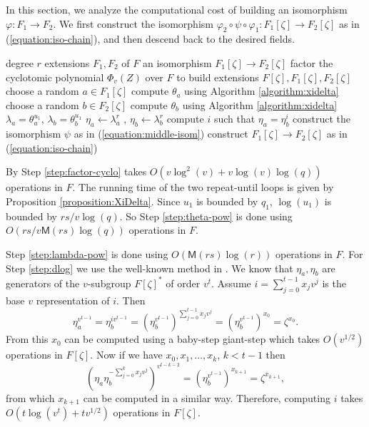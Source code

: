 \documentclass[12pt]{article}
\theoremstyle{plain}
\theoremstyle{definition}
\def\MM{\ensuremath{\mathsf{M}}}
\newcounter{algorithm}
\begin{document}
In this section, we analyze the computational cost of building an isomorphism $\varphi: F_1 
\rightarrow F_2$. We first construct the isomorphism $\varphi_2 \circ \psi \circ \varphi_1 : 
F_1[\zeta] \rightarrow F_2[\zeta]$ as in (\ref{equation:iso-chain}), and then descend back to the 
desired fields.
\begin{algorithm}
	\label{algorithm:ext-iso}
	\begin{algorithmic}[1]
		\REQUIRE degree $r$ extensions $F_1, F_2$ of $F$
		\ENSURE an isomorphism $F_1[\zeta] \rightarrow F_2[\zeta]$
		\STATE\label{step:factor-cyclo} factor the cyclotomic polynomial $\Phi_v(Z)$ over $F$ to 
		build extensions $F[\zeta],	F_1[\zeta], F_2[\zeta]$
		\REPEAT
		\STATE choose a random $a \in F_1[\zeta]$
		\STATE compute $\theta_a$ using Algorithm \ref{algorithm:xidelta}
		\REPEAT
		\STATE choose a random $b \in F_2[\zeta]$
		\STATE compute $\theta_b$ using Algorithm \ref{algorithm:xidelta}
		\STATE\label{step:theta-pow} $\lambda_a = \theta_a^{u_1}$, $\lambda_b = \theta_b^{u_1}$
		\STATE\label{step:lambda-pow} $\eta_a \leftarrow \lambda_a^r$ , $\eta_b \leftarrow 
		\lambda_b^r$
		\STATE\label{step:dlog} compute $i$ such that $\eta_a = \eta_b^i$
		\STATE\label{step:psi} construct the isomorphism $\psi$ as in (\ref{equation:middle-isom})
		\STATE construct $F_1[\zeta] \rightarrow F_2[\zeta]$ as in (\ref{equation:iso-chain})
	\end{algorithmic}
\end{algorithm}

By \cite[Theorem 9]{shoup94} Step \ref{step:factor-cyclo} takes $O(v\log^2(v) + v\log(v)\log(q))$ 
operations in $F$. The running time of the two repeat-until loops is given by Proposition 
\ref{proposition:XiDelta}. Since $u_1$ is bounded by $q_1$, $\log(u_1)$ is bounded by 
$rs/v\log(q)$. So Step \ref{step:theta-pow} is done using $O(rs/v\MM(rs)\log(q))$ operations in 
$F$. 

Step \ref{step:lambda-pow} is done using $O(\MM(rs)\log(r))$ operations in $F$. For Step 
\ref{step:dlog} we use the well-known method in \cite{Pohlig1978}. We know that $\eta_a, \eta_b$ 
are generators of the $v$-subgroup $F[\zeta]^*$ of order $v^t$. Assume $i = \sum_{j = 0}^{t - 
1}x_jv^j$ is the base $v$ representation of $i$. Then
\[ \eta_a^{v^{t - 1}} = \eta_b^{iv^{t - 1}} = (\eta_b^{v^{t - 1}})^{\sum_{j = 0}^{t - 1}x_jv^j} = 
(\eta_b^{v^{t - 1}})^{x_0} = \zeta^{x_0}.\]
From this $x_0$ can be computed using a baby-step giant-step which takes $O(v^{1/2})$ 
operations in $F[\zeta]$. Now if we have $x_0, x_1, \dots, x_k$, $k < t - 1$ then
\[ (\eta_a\eta_b^{-\sum_{j = 0}^{k}x_jv^j})^{v^{t - k - 2}} = (\eta_b^{v^{t - 1}})^{x_{k + 1}} = 
\zeta^{x_{k + 1}},\] from which $x_{k + 1}$ can be computed in a similar way. Therefore, computing 
$i$ takes $O(t\log(v^t) + tv^{1/2})$ operations in $F[\zeta]$. 
\end{document}

